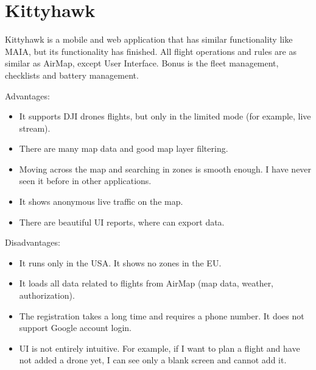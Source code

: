 \section{Kittyhawk}\label{sec:kittyhawk}
Kittyhawk is a mobile and web application that has similar functionality like MAIA, but its functionality has finished.
All flight operations and rules are as similar as AirMap, except User Interface.
Bonus is the fleet management, checklists and battery management.

Advantages:
\begin{itemize}
    \item It supports DJI drones flights, but only in the limited mode (for example, live stream).
    \item There are many map data and good map layer filtering.
    \item Moving across the map and searching in zones is smooth enough.
    I have never seen it before in other applications.
    \item It shows anonymous live traffic on the map.
    \item There are beautiful UI reports, where can export data.
\end{itemize}
Disadvantages:
\begin{itemize}
    \item It runs only in the USA. It shows no zones in the EU.
    \item It loads all data related to flights from AirMap (map data, weather, authorization).
    \item The registration takes a long time and requires a phone number.
    It does not support Google account login.
    \item UI is not entirely intuitive.
    For example, if I want to plan a flight and have not added a drone yet, I can see only a blank screen and cannot add it.
\end{itemize}
